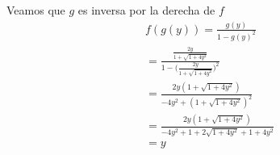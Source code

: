 \documentclass{article}
\begin{document}
Veamos que \(g\) es inversa por la derecha de \(f\)
\begin{equation}
\begin{aligned}
f(g(y))=\frac{g(y)}{1-g(y)^2}
\\
=\frac{\frac{2y}{1+\sqrt{1+4y^2}}}{1-\big(\frac{2y}{1+\sqrt{1+4y^2}}\big)^2}\\
=\frac{2y(1+\sqrt{1+4y^2})}{-4y^2+(1+\sqrt{1+4y^2})^2}\\
=\frac{2y(1+\sqrt{1+4y^2})}{-4y^2+1+2\sqrt{1+4y^2}+1+4y^2}\\
=y
\end{aligned}
\end{equation}
%
%
\end{document}
